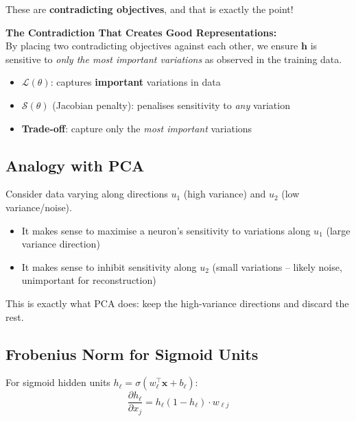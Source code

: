 \documentclass[12pt,a4paper]{article}
\newcommand{\vx}{\mathbf{x}}
\newcommand{\vh}{\mathbf{h}}
\newcommand{\Loss}{\mathcal{L}}
\newcommand{\Reg}{\mathcal{S}}
\begin{document}
These are \textbf{contradicting objectives}, and that is exactly the point!

\begin{keybox}
\textbf{The Contradiction That Creates Good Representations:}\\
By placing two contradicting objectives against each other, we ensure $\vh$ is sensitive to \emph{only the most important variations} as observed in the training data.

\begin{itemize}
  \item $\Loss(\theta)$: captures \textbf{important} variations in data
  \item $\Reg(\theta)$ (Jacobian penalty): penalises sensitivity to \emph{any} variation
  \item \textbf{Trade-off}: capture only the \emph{most important} variations
\end{itemize}
\end{keybox}

\subsection{Analogy with PCA}

Consider data varying along directions $u_1$ (high variance) and $u_2$ (low variance/noise).
\begin{itemize}
  \item It makes sense to maximise a neuron's sensitivity to variations along $u_1$ (large variance direction)
  \item It makes sense to inhibit sensitivity along $u_2$ (small variations -- likely noise, unimportant for reconstruction)
\end{itemize}

This is exactly what PCA does: keep the high-variance directions and discard the rest.

\subsection{Frobenius Norm for Sigmoid Units}

For sigmoid hidden units $h_\ell = \sigma(w_\ell^\top\vx + b_\ell)$:
\[
  \frac{\partial h_\ell}{\partial x_j}
  = h_\ell(1-h_\ell)\cdot w_{\ell j}
\]
\end{document}
